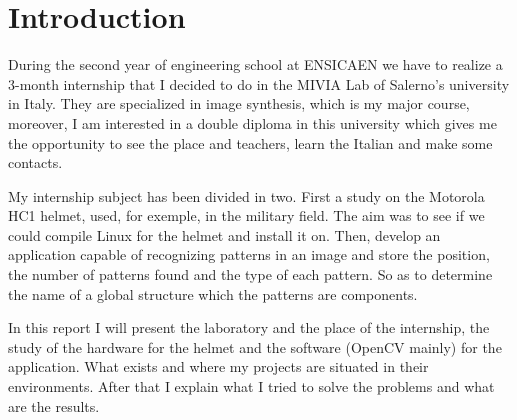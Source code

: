 \chapter{Introduction}

\par During the second year of engineering school at ENSICAEN we have to realize a 3-month internship that I decided to do in the MIVIA Lab of Salerno's university in Italy. They are specialized in image synthesis, which is my major course, moreover, I am interested in a double diploma in this university which gives me the opportunity to see the place and teachers, learn the Italian and make some contacts.
\par My internship subject has been divided in two. First a study on the Motorola HC1 helmet, used, for exemple, in the military field. The aim was to see if we could compile Linux for the helmet and install it on. Then, develop an application capable of recognizing patterns in an image and store the position, the number of patterns found and the type of each pattern. So as to determine the name of a global structure which the patterns are components.
\par In this report I will present the laboratory and the place of the internship, the study of the hardware for the helmet and the software (OpenCV mainly) for the application. What exists and where my projects are situated in their environments. After that I explain what I tried to solve the problems and what are the results.
